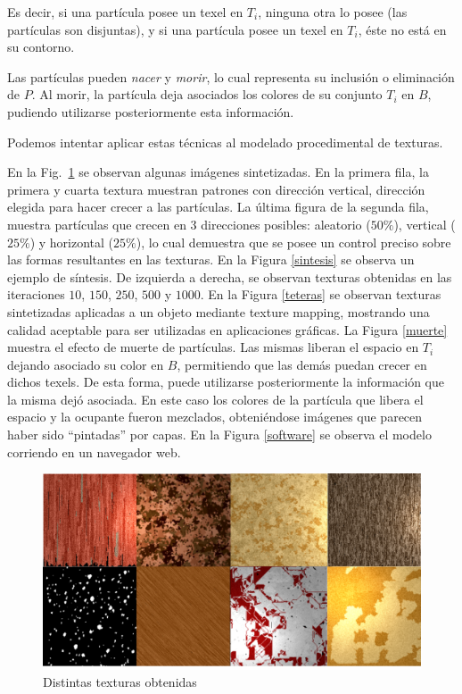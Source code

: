 \documentclass[spanish,a4paper,openright,11pt]{book}
\begin{document}
Es decir, si una part\'icula posee un texel en $T_{i}$, ninguna otra lo posee (las part\'iculas son disjuntas), y si una part\'icula posee un texel en $T_{i}$, \'este no est\'a en su contorno.

Las part\'iculas pueden {\em nacer} y {\em morir}, lo cual representa su inclusi\'on o eliminaci\'on de $P$.
Al morir, la part\'icula deja asociados los colores de su conjunto $T_{i}$ en $B$, pudiendo utilizarse posteriormente esta informaci\'on.

Podemos intentar aplicar estas técnicas al modelado procedimental de texturas. 

En la Fig.~\ref{resultados} se observan algunas im\'agenes sintetizadas.
En la primera fila, la primera y cuarta textura muestran patrones con direcci\'on vertical, direcci\'on elegida para hacer crecer a las part\'iculas.
La \'ultima figura de la segunda fila, muestra part\'iculas que crecen en 3 direcciones posibles: aleatorio ($50\%$), vertical ($25\%$) y horizontal ($25\%$), lo cual demuestra que se posee un control preciso sobre las formas resultantes en las texturas.
En la Figura \ref{sintesis} se observa un ejemplo de s\'intesis.
De izquierda a derecha, se observan texturas obtenidas en las iteraciones $10$, $150$, $250$, $500$ y $1000$.
En la Figura \ref{teteras} se observan texturas sintetizadas aplicadas a un objeto mediante texture mapping, mostrando una calidad aceptable para ser utilizadas en aplicaciones gr\'aficas.
La Figura \ref{muerte} muestra el efecto de muerte de part\'iculas.
Las mismas liberan el espacio en $T_{i}$ dejando asociado su color en $B$, permitiendo que las dem\'as puedan crecer en dichos texels.
De esta forma, puede utilizarse posteriormente la informaci\'on que la misma dej\'o asociada.
En este caso los colores de la part\'icula que libera el espacio y la ocupante fueron mezclados, obteni\'endose im\'agenes que parecen haber sido ``pintadas'' por capas.
En la Figura \ref{software} se observa el modelo corriendo en un navegador web.


\begin{figure}[t!]
\centering
\includegraphics[scale=0.18]{resultados}
\caption{Distintas texturas obtenidas}
\label{resultados}
\end{figure}
\end{document}
